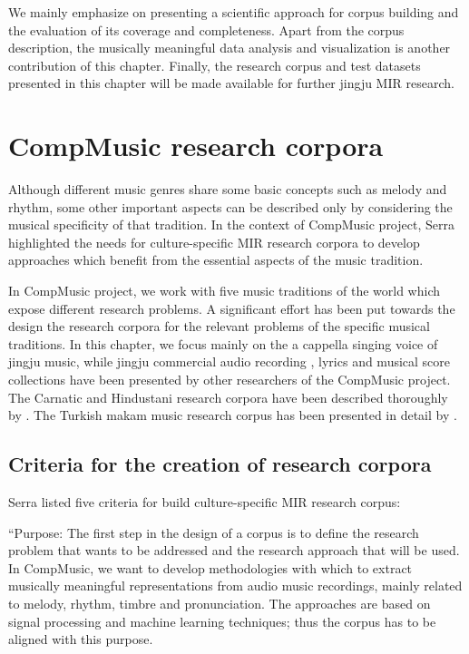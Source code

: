 We mainly emphasize on presenting a scientific approach for corpus building and the evaluation of its coverage and completeness. Apart from the corpus description, the musically meaningful data analysis and visualization is another contribution of this chapter. Finally, the research corpus and test datasets presented in this chapter will be made available for further jingju \gls{MIR} research.

\section{CompMusic research corpora}\label{sec:ch4:compmusic_corpora}

Although different music genres share some basic concepts such as melody and rhythm, some other important aspects can be described only by considering the musical specificity of that tradition. In the context of CompMusic project, Serra \cite{serra_multicultural_2011} highlighted the needs for culture-specific \gls{MIR} research corpora to develop approaches which benefit from the essential aspects of the music tradition. 

In CompMusic project, we work with five music traditions of the world which expose different research problems. A significant effort has been put towards the design the research corpora for the relevant problems of the specific musical traditions. In this chapter, we focus mainly on the a cappella singing voice of jingju music, while jingju commercial audio recording \cite{repetto_creating_2014}, lyrics and musical score collections \cite{Repetto2017} have been presented by other researchers of the CompMusic project. The Carnatic and Hindustani research corpora have been described thoroughly by \cite{Srinivasamurthy2014}. The Turkish makam music research corpus has been presented in detail by \cite{Uyar2014a}.

\subsection{Criteria for the creation of research corpora}

Serra \cite{Serra2014} listed five criteria for build culture-specific \gls{MIR} research corpus:

``Purpose: The first step in the design of a corpus is to define the research problem that wants to be addressed and the research approach that will be used. In CompMusic, we want to develop methodologies with which to extract musically meaningful representations from audio music recordings, mainly related to melody, rhythm, timbre and pronunciation. The approaches are based on signal processing and machine learning techniques; thus the corpus has to be aligned with this purpose.

